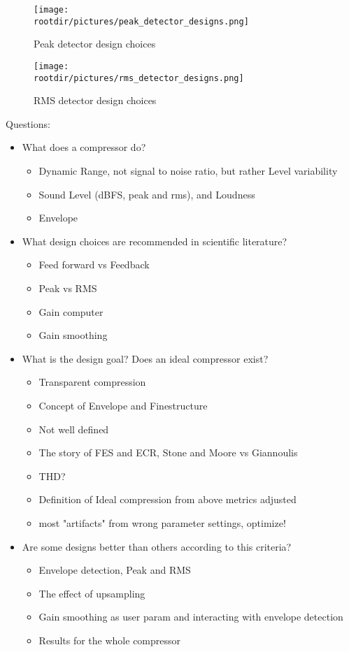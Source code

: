 \documentclass[../main2.tex]{subfiles}
\providecommand{\rootdir}{..}
\begin{document}
\begin{figure}
\centerline{
	\texttt{[image: \\rootdir/pictures/peak\_detector\_designs.png]}
}
\caption{Peak detector design choices}
\label{fig:peak_detector_design}
\end{figure}

\begin{figure}
\centerline{
	\texttt{[image: \\rootdir/pictures/rms\_detector\_designs.png]}
}
\caption{RMS detector design choices}
\label{fig:rms_detector_design}
\end{figure}

Questions:
\begin{itemize}
\item What does a compressor do?
	\begin{itemize}
	\item Dynamic Range, not signal to noise ratio, but rather Level variability
	\item Sound Level (dBFS, peak and rms), and Loudness
	\item Envelope
	\end{itemize}
	
\item What design choices are recommended in scientific literature?
	\begin{itemize}
	\item Feed forward vs Feedback
	\item Peak vs RMS
	\item Gain computer
	\item Gain smoothing
	\end{itemize}
	
\item What is the design goal? Does an ideal compressor exist?
	\begin{itemize}
	\item Transparent compression
	\item Concept of Envelope and Finestructure
	\item Not well defined
	\item The story of FES and ECR, Stone and Moore vs Giannoulis
	\item THD?
	\item Definition of Ideal compression from above metrics adjusted
	\item most "artifacts" from wrong parameter settings, optimize!
	\end{itemize}
	
\item Are some designs better than others according to this criteria?
	\begin{itemize}
	\item Envelope detection, Peak and RMS
	\item The effect of upsampling
	\item Gain smoothing as user param and interacting with envelope detection
	\item Results for the whole compressor
	\end{itemize}

\end{itemize}
\end{document}
